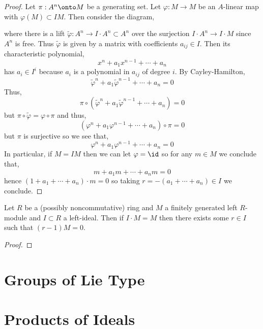 \documentclass[12pt]{article}
\begin{document}
\begin{proof}
Let $\pi : A^n \onto M$ be a generating set. Let $\varphi : M \to M$ be an $A$-linear map with $\varphi(M) \subset I M$. Then consider the diagram,
\begin{center}
\end{center}
where there is a lift $\tilde{\varphi} : A^n \to I \cdot A^n \subset A^n$ over the surjection $I \cdot A^n \to I \cdot M$ since $A^n$ is free. Thus $\tilde{\varphi}$ is given by a matrix with coefficients $a_{ij} \in I$. Then its characteristic polynomial,
\[ x^n + a_1 x^{n-1} + \cdots + a_n \]
has $a_i \in I^i$ because $a_i$ is a polynomial in $a_{ij}$ of degree $i$. By Cayley-Hamilton,
\[ \tilde{\varphi}^n + a_1 \tilde{\varphi}^{n-1} + \cdots + a_n = 0 \]
Thus,
\[ \pi \circ (\tilde{\varphi}^n + a_1 \tilde{\varphi}^{n-1} + \cdots + a_n) = 0 \]
but $\pi \circ \tilde{\varphi} = \varphi \circ \pi$ and thus,
\[ (\varphi^n + a_1 \varphi^{n-1} + \cdots + a_n) \circ \pi = 0 \]
but $\pi$ is surjective so we see that,
\[ \varphi^n + a_1 \varphi^{n-1} + \cdots + a_n = 0 \]
In particular, if $M = I M$ then we can let $\varphi = \id$ so for any $m \in M$ we conclude that,
\[ m + a_1 m + \cdots + a_n m = 0 \]
hence $(1 + a_1 + \cdots + a_{n}) \cdot m = 0$ so taking $r = -(a_1 + \cdots + a_n) \in I$ we conclude. 
\end{proof}


\begin{prop}
Let $R$ be a (possibly noncommutative) ring and $M$ a finitely generated left $R$-module and $I \subset R$ a left-ideal. Then if $I \cdot M = M$ then there exists some $r \in I$ such that $(r - 1) M = 0$.
\end{prop}

\begin{proof}

\end{proof}


\section{Groups of Lie Type}

\section{Products of Ideals}
\end{document}
